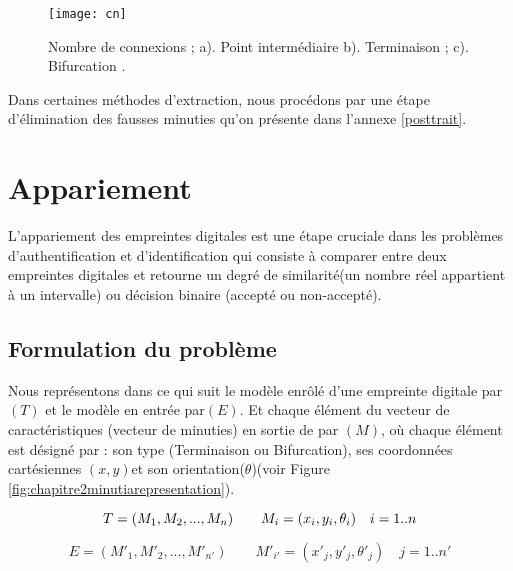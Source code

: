\begin{center}
	\begin{figure}[H]
		\centering
		\texttt{[image: cn]}
		\caption{Nombre de connexions ; a). Point intermédiaire b). Terminaison ; c). Bifurcation \citep{maltoni2009handbook}.}
		\label{fig:chapitre2cn}
	\end{figure}
\end{center}
Dans certaines méthodes d’extraction, nous procédons par une étape d’élimination des fausses minuties qu’on présente dans l’annexe \ref{posttrait}.
\section{Appariement}
L'appariement des empreintes digitales est une étape cruciale dans les problèmes d'authentification et d'identification qui consiste à comparer entre deux empreintes digitales et retourne un degré de similarité(un nombre réel appartient à un intervalle) ou décision binaire  (accepté ou non-accepté).
\\
\subsection{Formulation du problème}
Nous représentons dans ce qui suit le modèle enrôlé d’une empreinte digitale par $ (T) $ et le modèle en entrée par$  (E) $. Et chaque élément du vecteur de caractéristiques (vecteur de minuties) en sortie de par $ (M) $, où chaque élément est désigné par : son type (Terminaison ou Bifurcation), ses coordonnées cartésiennes $ (x, y)  $et son orientation($\theta$)(voir Figure \ref{fig:chapitre2minutiarepresentation}). 
\begin{center}
	\begin{equation}\label{eq:t}
		\abovedisplayskip
	\belowdisplayskip
	T=(M_{1},M_{2}, ..., M_{n})\qquad M_{i}=(x_{i},y_{i},\theta_{i})\quad i = 1 .. n
	\end{equation}
\end{center}
\begin{center}
	\begin{equation}\label{eq:e}
	E=(M\prime_{1},M\prime_{2}, ..., M\prime_{n\prime})\qquad M\prime _{i\prime }=(x\prime _{j },y\prime_{j},\theta\prime_{j}) \quad j = 1 .. n\prime
	\end{equation}
\end{center}


